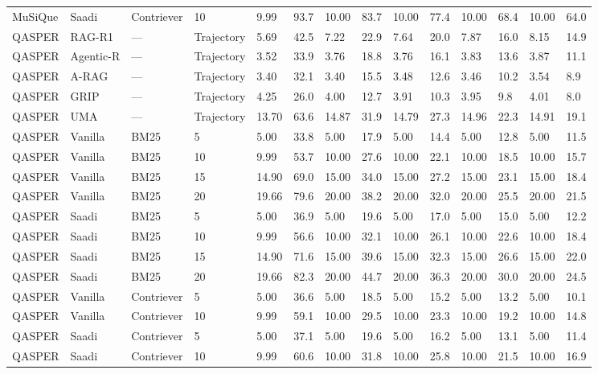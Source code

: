 \begin{tabular}{llllllllllllll}
MuSiQue & Saadi & Contriever & 10 & 9.99 & 93.7 & 10.00 & 83.7 & 10.00 & 77.4 & 10.00 & 68.4 & 10.00 & 64.0 \\
QASPER & RAG-R1 & — & Trajectory & 5.69 & 42.5 & 7.22 & 22.9 & 7.64 & 20.0 & 7.87 & 16.0 & 8.15 & 14.9 \\
QASPER & Agentic-R & — & Trajectory & 3.52 & 33.9 & 3.76 & 18.8 & 3.76 & 16.1 & 3.83 & 13.6 & 3.87 & 11.1 \\
QASPER & A-RAG & — & Trajectory & 3.40 & 32.1 & 3.40 & 15.5 & 3.48 & 12.6 & 3.46 & 10.2 & 3.54 & 8.9 \\
QASPER & GRIP & — & Trajectory & 4.25 & 26.0 & 4.00 & 12.7 & 3.91 & 10.3 & 3.95 & 9.8 & 4.01 & 8.0 \\
QASPER & UMA & — & Trajectory & 13.70 & 63.6 & 14.87 & 31.9 & 14.79 & 27.3 & 14.96 & 22.3 & 14.91 & 19.1 \\
QASPER & Vanilla & BM25 & 5 & 5.00 & 33.8 & 5.00 & 17.9 & 5.00 & 14.4 & 5.00 & 12.8 & 5.00 & 11.5 \\
QASPER & Vanilla & BM25 & 10 & 9.99 & 53.7 & 10.00 & 27.6 & 10.00 & 22.1 & 10.00 & 18.5 & 10.00 & 15.7 \\
QASPER & Vanilla & BM25 & 15 & 14.90 & 69.0 & 15.00 & 34.0 & 15.00 & 27.2 & 15.00 & 23.1 & 15.00 & 18.4 \\
QASPER & Vanilla & BM25 & 20 & 19.66 & 79.6 & 20.00 & 38.2 & 20.00 & 32.0 & 20.00 & 25.5 & 20.00 & 21.5 \\
QASPER & Saadi & BM25 & 5 & 5.00 & 36.9 & 5.00 & 19.6 & 5.00 & 17.0 & 5.00 & 15.0 & 5.00 & 12.2 \\
QASPER & Saadi & BM25 & 10 & 9.99 & 56.6 & 10.00 & 32.1 & 10.00 & 26.1 & 10.00 & 22.6 & 10.00 & 18.4 \\
QASPER & Saadi & BM25 & 15 & 14.90 & 71.6 & 15.00 & 39.6 & 15.00 & 32.3 & 15.00 & 26.6 & 15.00 & 22.0 \\
QASPER & Saadi & BM25 & 20 & 19.66 & 82.3 & 20.00 & 44.7 & 20.00 & 36.3 & 20.00 & 30.0 & 20.00 & 24.5 \\
QASPER & Vanilla & Contriever & 5 & 5.00 & 36.6 & 5.00 & 18.5 & 5.00 & 15.2 & 5.00 & 13.2 & 5.00 & 10.1 \\
QASPER & Vanilla & Contriever & 10 & 9.99 & 59.1 & 10.00 & 29.5 & 10.00 & 23.3 & 10.00 & 19.2 & 10.00 & 14.8 \\
QASPER & Saadi & Contriever & 5 & 5.00 & 37.1 & 5.00 & 19.6 & 5.00 & 16.2 & 5.00 & 13.1 & 5.00 & 11.4 \\
QASPER & Saadi & Contriever & 10 & 9.99 & 60.6 & 10.00 & 31.8 & 10.00 & 25.8 & 10.00 & 21.5 & 10.00 & 16.9 \\
\hline
\end{tabular}
